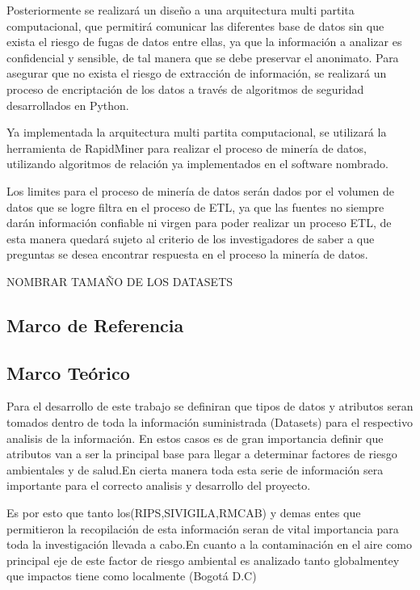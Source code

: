 \documentclass[a4paper, 11pt, oneside]{article}
\theoremstyle{definition}
\theoremstyle{remark}
\begin{document}
Posteriormente se realizará un diseño a una arquitectura multi partita computacional, que permitirá comunicar las diferentes base de datos sin que exista el riesgo de fugas de datos entre ellas, ya que la información a analizar es confidencial y sensible, de tal manera que se debe preservar el anonimato. Para asegurar que no exista el riesgo de extracción de información, se realizará un proceso de encriptación de los datos a través de algoritmos de seguridad desarrollados en Python.

Ya implementada la arquitectura multi partita computacional, se utilizará la herramienta de RapidMiner para realizar el proceso de minería de datos, utilizando algoritmos de relación ya implementados en el software nombrado.

Los limites para el proceso de minería de datos serán dados por el volumen de datos que se logre filtra en el proceso de ETL, ya que las fuentes no siempre darán información confiable ni virgen para poder realizar un proceso ETL, de esta manera quedará sujeto al criterio de los investigadores de saber a que preguntas se desea encontrar respuesta en el proceso la minería de datos.

NOMBRAR TAMAÑO DE LOS DATASETS

\clearpage

\begin{center}
 \section{Marco de Referencia}
\end{center}

\subsection{Marco Teórico}
Para el desarrollo de este trabajo se definiran que tipos de datos y atributos seran tomados dentro de toda la información suministrada (Datasets) para el respectivo analisis de la información. En estos casos es de gran importancia definir que atributos van a ser la principal base para llegar a determinar factores de riesgo ambientales y de salud.En cierta manera toda esta serie de información sera importante para el correcto analisis y desarrollo del proyecto.
  
Es por esto que tanto los(RIPS,SIVIGILA,RMCAB) y demas entes que permitieron la recopilación de esta información seran de vital importancia para toda la investigación llevada a cabo.En cuanto a la contaminación en el aire como principal eje de este factor de riesgo ambiental es analizado tanto globalmentey que impactos tiene como localmente (Bogotá D.C)
\end{document}
